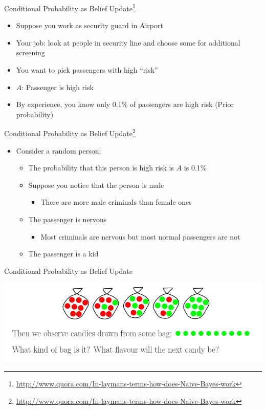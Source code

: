 \documentclass{beamer}
\newcommand{\furl}[1]{{\footnote{\url{#1}}}}
\begin{document}
\begin{frame}{Conditional Probability as Belief Update\furl{http://www.quora.com/In-laymans-terms-how-does-Naive-Bayes-work}}
    \begin{itemize}
        \item Suppose you work as security guard in Airport
        \item Your job: look at people in security line and choose some for additional screening
        \item You want to pick passengers with high ``risk''
        \item $A$: Passenger is high risk
        \item By experience, you know only 0.1\% of passengers are high risk (Prior probability)
    \end{itemize}
\end{frame}

\begin{frame}{Conditional Probability as Belief Update\furl{http://www.quora.com/In-laymans-terms-how-does-Naive-Bayes-work}}
    \begin{itemize}
        \item Consider a random person:
        \begin{itemize}
            \item The probability that this person is high risk is $A$ is 0.1\%
            \item Suppose you notice that the person is male  \pause
            \begin{itemize}
                \item There are more male criminals than female ones 
            \end{itemize}
            \item The passenger is nervous \pause
            \begin{itemize}
                \item Most criminals are nervous but most normal passengers are not
            \end{itemize}
            \item The passenger is a kid \pause
        \end{itemize}
    \end{itemize}
\end{frame}

\begin{frame}{Conditional Probability as Belief Update}
    \begin{center}
        \includegraphics[scale=0.46]{candyEg.png}
    \end{center}
\end{frame}
\end{document}
